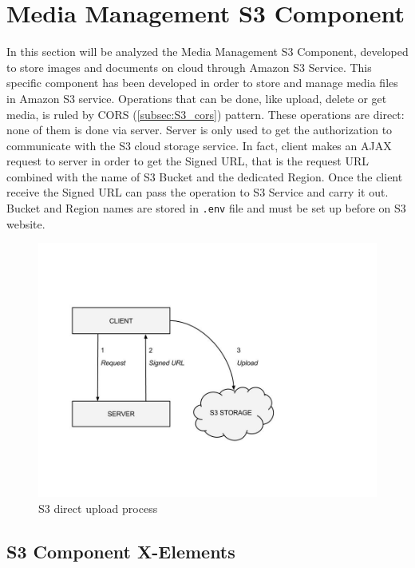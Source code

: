 \section{Media Management S3 Component}
\label{sec:S3_component}

In this section will be analyzed the Media Management S3 Component, developed to store images and documents on cloud through Amazon S3 Service.
This specific component has been developed in order to store and manage media files in Amazon S3 service.
Operations that can be done, like upload, delete or get media, is ruled by CORS (\ref{subsec:S3_cors}) pattern.
These operations are direct: none of them is done via server. Server is only used to get the authorization to communicate with the S3 cloud storage service.
In fact, client makes an AJAX request to server in order to get the Signed URL, that is the request URL combined with the name of S3 Bucket and the dedicated Region. 
Once the client receive the Signed URL can pass the operation to S3 Service and carry it out.
Bucket and Region names are stored in \texttt{.env} file and must be set up before on S3 website.

\begin {figure}[h]
\graphicspath{{images/chapter_s3/}}
\includegraphics[width=\textwidth]{s3_upload}
\caption{S3 direct upload process}
\end {figure}



\subsection{S3 Component X-Elements}
\label{subsec:S3_server_elem}


